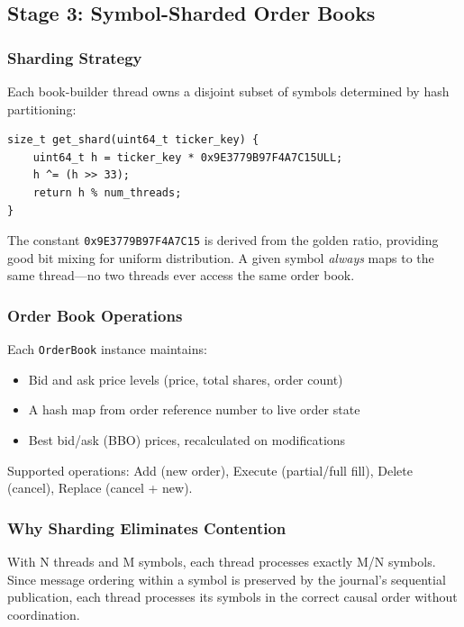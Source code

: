\documentclass[conference]{IEEEtran}
\begin{document}
\subsection{Stage 3: Symbol-Sharded Order Books}

\subsubsection{Sharding Strategy}

Each book-builder thread owns a disjoint subset of symbols determined by hash partitioning:

\begin{lstlisting}[style=cppstyle, caption={Symbol-to-shard assignment}]
size_t get_shard(uint64_t ticker_key) {
    uint64_t h = ticker_key * 0x9E3779B97F4A7C15ULL;
    h ^= (h >> 33);
    return h % num_threads;
}
\end{lstlisting}

The constant \texttt{0x9E3779B97F4A7C15} is derived from the golden ratio, providing good bit mixing for uniform distribution. A given symbol \textit{always} maps to the same thread---no two threads ever access the same order book.

\subsubsection{Order Book Operations}

Each \texttt{OrderBook} instance maintains:
\begin{itemize}
    \item Bid and ask price levels (price, total shares, order count)
    \item A hash map from order reference number to live order state
    \item Best bid/ask (BBO) prices, recalculated on modifications
\end{itemize}

Supported operations: Add (new order), Execute (partial/full fill), Delete (cancel), Replace (cancel + new).

\subsubsection{Why Sharding Eliminates Contention}

With N threads and M symbols, each thread processes exactly M/N symbols. Since message ordering within a symbol is preserved by the journal's sequential publication, each thread processes its symbols in the correct causal order without coordination.
\end{document}
